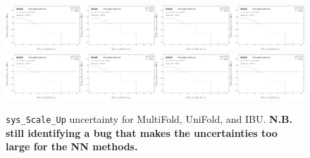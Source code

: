 \begin{figure}[h!]
\includegraphics[width=0.25\textwidth,page=135]{figures/SimResults/Lepton_SystEffect.pdf}\includegraphics[width=0.25\textwidth,page=143]{figures/SimResults/Lepton_SystEffect.pdf}\includegraphics[width=0.25\textwidth,page=151]{figures/SimResults/Lepton_SystEffect.pdf}\includegraphics[width=0.25\textwidth,page=159]{figures/SimResults/Lepton_SystEffect.pdf}\\
\includegraphics[width=0.25\textwidth,page=167]{figures/SimResults/Lepton_SystEffect.pdf}\includegraphics[width=0.25\textwidth,page=175]{figures/SimResults/Lepton_SystEffect.pdf}\includegraphics[width=0.25\textwidth,page=183]{figures/SimResults/Lepton_SystEffect.pdf}\includegraphics[width=0.25\textwidth,page=191]{figures/SimResults/Lepton_SystEffect.pdf}
\caption{\texttt{sys\_Scale\_Up} uncertainty for MultiFold, UniFold, and IBU.  \textbf{N.B. still identifying a bug that makes the uncertainties too large for the NN methods.}}
\label{fig:simresultsmulti_Leptonuncertsl7}
\end{figure}

